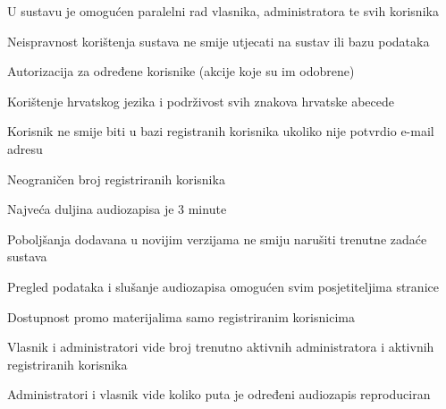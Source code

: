 	\begin{packed_item}

		\item {U sustavu je omogućen paralelni rad vlasnika, administratora \newline te svih korisnika}
		\item {Neispravnost korištenja sustava ne smije utjecati na sustav ili bazu podataka}
		\item {Autorizacija za određene korisnike (akcije koje su im odobrene)}
		\item {Korištenje hrvatskog jezika i podrživost svih znakova hrvatske abecede}
		\item {Korisnik ne smije biti u bazi registranih korisnika ukoliko nije \newline potvrdio e-mail adresu}
		\item {Neograničen broj registriranih korisnika}
		\item {Najveća duljina audiozapisa je 3 minute}
		\item {Poboljšanja dodavana u novijim verzijama ne smiju narušiti trenutne \newline zadaće sustava}
		\item {Pregled podataka i slušanje audiozapisa omogućen svim \newline posjetiteljima stranice}
		\item {Dostupnost promo materijalima samo registriranim korisnicima}
		\item {Vlasnik i administratori vide broj trenutno aktivnih administratora i \newline aktivnih registriranih korisnika}
		\item {Administratori i vlasnik vide koliko puta je određeni audiozapis reproduciran}
	
	\end{packed_item}



